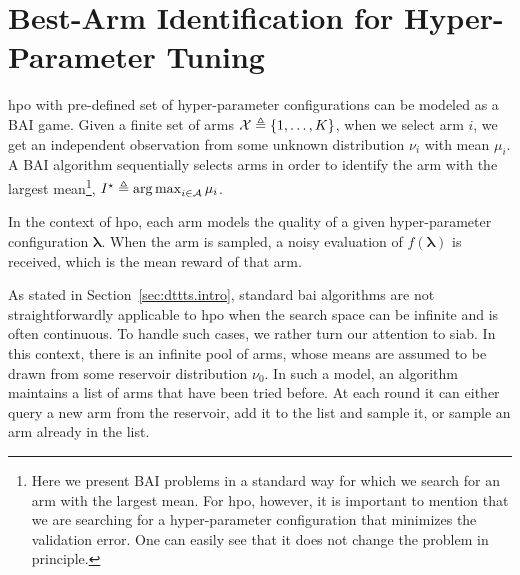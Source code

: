 \section{Best-Arm Identification for Hyper-Parameter Tuning}\label{sec:dttts.bai}

\gls{hpo} with pre-defined set of hyper-parameter configurations can be modeled as a BAI game. Given a finite set of arms $\mathcal{X} \triangleq \{1,\ldots,K\}$, when we select arm $i$, we get an independent observation from some unknown distribution $\nu_i$ with mean $\mu_i$. A BAI algorithm sequentially selects arms in order to identify the arm with the largest mean\footnote{Here we present BAI problems in a standard way for which we search for an arm with the largest mean. For \gls{hpo}, however, it is important to mention that we are searching for a hyper-parameter configuration that minimizes the validation error. One can easily see that it does not change the problem in principle.}, $I^\star \triangleq \operatorname*{arg\,max}_{i\in\mathcal{A}}\mu_i$. 

In the context of \gls{hpo}, each arm models the quality of a given hyper-parameter configuration $\bm\lambda$. When the arm is sampled, a noisy evaluation of $f(\bm\lambda)$ is received, which is the mean reward of that arm.


As stated in Section~\ref{sec:dttts.intro}, standard \gls{bai} algorithms are not straightforwardly applicable to \gls{hpo} when the search space can be infinite and is often continuous. To handle such cases, we rather turn our attention to \gls{siab}. In this context, there is an infinite pool of arms, whose means are assumed to be drawn from some \gls{reservoir} distribution $\nu_0$. In such a model, an algorithm maintains a list of arms that have been tried before. At each round it can either query a new arm from the reservoir, add it to the list and sample it, or sample an arm already in the list.

